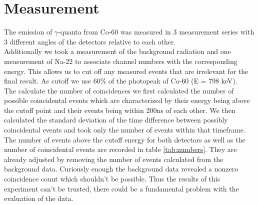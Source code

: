 


\section{Measurement}

The emission of $\gamma$-quanta from Co-60 was measured in 3 measurement series with 3 different angles of the detectors relative to each other.\\
Additionally we took a measurement of the background radiation and one measurement of Na-22 to associate channel numbers with the corresponding energy.
This allows us to cut off any measured events that are irrelevant for the final result. As cutoff we use 60\% of the photopeak of Co-60 (E = 798 keV).\\
The calculate the number of coincidences we first calculated the number of possible coincidental events which are characterized by their energy being above the cutoff point and  their events being within 200\;ns of each other.
We then calculated the standard deviation of the time difference between possibly coincidental events and took only the number of events within that timeframe.\\
The number of events above the cutoff energy for both detectors as well as the number of coincidental events are recorded in table \ref{tab:numbers}. They are already adjusted by removing the number of events calculated from the background data.
Curiously enough the background data revealed a nonzero coincidence count which shouldn't be possible. Thus the results of this experiment can't be trusted, there could be a fundamental problem with the evaluation of the data.

